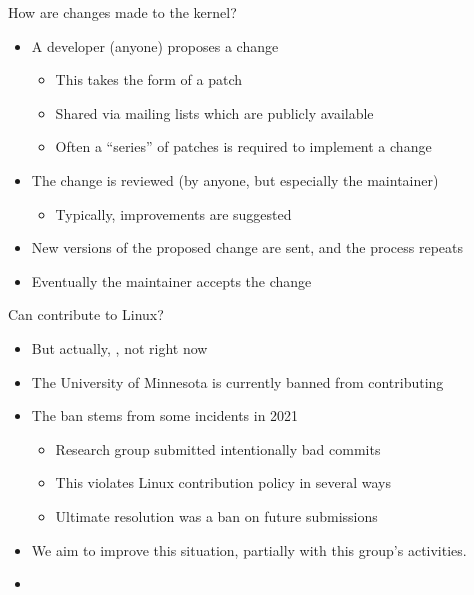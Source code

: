 \documentclass[aspectratio=169, notes]{beamer}
\begin{document}
\begin{frame}{How are changes made to the kernel?}
	\begin{itemize}
	\item A developer (anyone) proposes a change
		\begin{itemize}
		\item This takes the form of a patch
		\item Shared via  mailing lists which are publicly available
		\item Often a ``series'' of patches is required to implement a change
		\end{itemize}
	\item The change is reviewed (by anyone, but especially the maintainer)
		\begin{itemize}
		\item Typically, improvements are suggested
		\end{itemize}
	\item New versions of the proposed change are sent, and the process repeats
	\item Eventually the maintainer accepts the change
	\end{itemize}
\end{frame}

\begin{frame}{Can  contribute to Linux?}
	\begin{itemize}
	\item {}  But actually, , not right now
	\item The University of Minnesota is currently banned from contributing
	\item The ban stems from some incidents in 2021
		\begin{itemize}
		\item Research group submitted intentionally bad commits
		\item This violates Linux contribution policy in several ways
		\item Ultimate resolution was a ban on future submissions
		\end{itemize}
	\item We aim to improve this situation, partially with this group’s activities.
	\item {}
	\end{itemize}
\end{frame}
\end{document}
